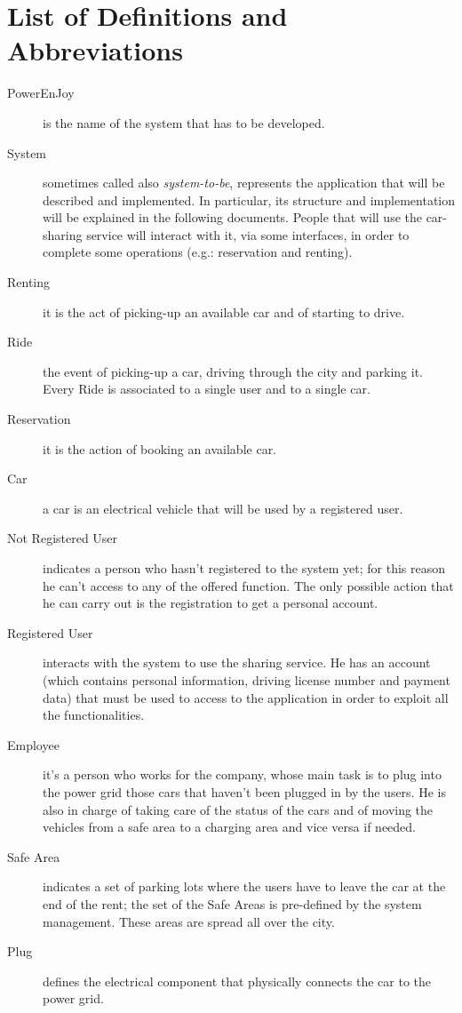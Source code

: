 \documentclass[11pt,a4paper]{report}
\begin{document}
\section{List of Definitions and Abbreviations}
\begin{description}
	\item[PowerEnJoy]is the name of the system that has to be developed.
	\item[System]sometimes called also \textit{system-to-be}, represents the application that will be described and implemented.
	In particular, its structure and implementation will be explained in the following documents. People that will use the car-sharing service will interact with it, via some interfaces, in order to complete some operations (e.g.: reservation and renting).
	\item[Renting]it is the act of picking-up an available car and of starting to drive.
	\item[Ride] the event of picking-up a car, driving through the city and parking it. Every Ride is associated to a single user and to a single car.
	\item[Reservation]it is the action of booking an available car.
	\item[Car] a car is an electrical vehicle that will be used by a registered user.
	\item[Not Registered User] indicates a person who hasn't registered to the system yet; for this reason he can't access to any of the offered function. The only possible action that he can carry out is the registration to get a personal account.
	\item[Registered User] interacts with the system to use the sharing service. He has an account (which contains personal information, driving license number and payment data) that must be used to access to the application in order to exploit all the functionalities.
	\item[Employee] it's a person who works for the company, whose main task is to plug into the power grid those cars that haven't been plugged in by the users. He is also in charge of taking care of the status of the cars and of moving the vehicles from a safe area to a charging area and vice versa if needed.
	\item[Safe Area] indicates a set of parking lots where the users have to leave the car at the end of the rent; the set of the Safe Areas is pre-defined by the system management. These areas are spread all over the city.
	\item[Plug] defines the electrical component that physically connects the car to the power grid.

\end{description}
\end{document}
